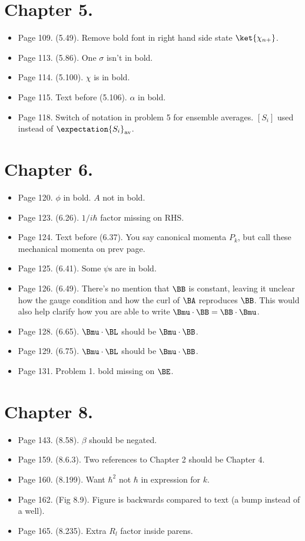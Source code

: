 \section{Chapter 5.}
\begin{itemize}
\item Page 109.  (5.49). Remove bold font in right hand side state $\ket{\chi_{n+}}$.
\item Page 113.  (5.86). One $\sigma$ isn't in bold.
\item Page 114.  (5.100). $\chi$ is in bold.
\item Page 115.  Text before (5.106). $\alpha$ in bold.
\item Page 118.  Switch of notation in problem 5 for ensemble averages.  $[S_i]$ used instead of $\expectation{S_i}_{\text{av}}$.
\end{itemize}

\section{Chapter 6.}
\begin{itemize}
\item Page 120.  $\phi$ in bold.  $A$ not in bold.
\item Page 123.  (6.26).  $1/i \hbar$ factor missing on RHS.
\item Page 124.  Text before (6.37).  You say canonical momenta $P_k$, but call these mechanical momenta on prev page.
\item Page 125.  (6.41).  Some $\psi$s are in bold.
\item Page 126.  (6.49).  There's no mention that $\BB$ is constant, leaving it unclear how the gauge condition and how the curl of $\BA$ reproduces $\BB$.  This would also help clarify how you are able to write $\Bmu \cdot \BB = \BB \cdot \Bmu$.
\item Page 128.  (6.65).  $\Bmu \cdot \BL$ should be $\Bmu \cdot \BB$.
\item Page 129.  (6.75).  $\Bmu \cdot \BL$ should be $\Bmu \cdot \BB$.
\item Page 131.  Problem 1.  bold missing on $\BE$.
\end{itemize}

\section{Chapter 8.}
\begin{itemize}
\item Page 143.  (8.58).  $\beta$ should be negated.
\item Page 159.  (8.6.3).  Two references to Chapter 2 should be Chapter 4.
\item Page 160.  (8.199).  Want $\hbar^2$ not $\hbar$ in expression for $k$.
\item Page 162.  (Fig 8.9).  Figure is backwards compared to text (a bump instead of a well).
\item Page 165.  (8.235).  Extra $R_l$ factor inside parens.
\end{itemize}

